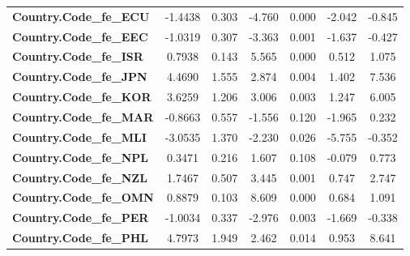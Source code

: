 \begin{center}
\begin{tabular}{lcccccc}
\textbf{Country.Code\_fe\_ECU}                                     &      -1.4438  &        0.303     &    -4.760  &         0.000        &       -2.042    &       -0.845     \\
\textbf{Country.Code\_fe\_EEC}                                     &      -1.0319  &        0.307     &    -3.363  &         0.001        &       -1.637    &       -0.427     \\
\textbf{Country.Code\_fe\_ISR}                                     &       0.7938  &        0.143     &     5.565  &         0.000        &        0.512    &        1.075     \\
\textbf{Country.Code\_fe\_JPN}                                     &       4.4690  &        1.555     &     2.874  &         0.004        &        1.402    &        7.536     \\
\textbf{Country.Code\_fe\_KOR}                                     &       3.6259  &        1.206     &     3.006  &         0.003        &        1.247    &        6.005     \\
\textbf{Country.Code\_fe\_MAR}                                     &      -0.8663  &        0.557     &    -1.556  &         0.120        &       -1.965    &        0.232     \\
\textbf{Country.Code\_fe\_MLI}                                     &      -3.0535  &        1.370     &    -2.230  &         0.026        &       -5.755    &       -0.352     \\
\textbf{Country.Code\_fe\_NPL}                                     &       0.3471  &        0.216     &     1.607  &         0.108        &       -0.079    &        0.773     \\
\textbf{Country.Code\_fe\_NZL}                                     &       1.7467  &        0.507     &     3.445  &         0.001        &        0.747    &        2.747     \\
\textbf{Country.Code\_fe\_OMN}                                     &       0.8879  &        0.103     &     8.609  &         0.000        &        0.684    &        1.091     \\
\textbf{Country.Code\_fe\_PER}                                     &      -1.0034  &        0.337     &    -2.976  &         0.003        &       -1.669    &       -0.338     \\
\textbf{Country.Code\_fe\_PHL}                                     &       4.7973  &        1.949     &     2.462  &         0.014        &        0.953    &        8.641     \\

\end{tabular}
\end{center}
